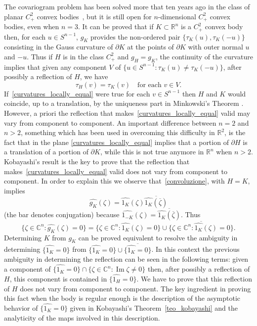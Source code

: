 \documentclass[a4paper]{amsart}
\theoremstyle{definition}
\numberwithin{equation}{section}
\begin{document}
The covariogram problem has been solved more that ten years ago in the class of planar $C^2_+$ convex bodies~\cite{Bianchi-Segala-Volcic-2002}, but it is still open for $n$-dimensional $C^2_+$ convex bodies, even when $n=3$.
It can be proved that if $K\subset{\mathbb{R}}^n$ is a $C^2_+$ convex body then, for each $u\in {S^{n-1}}$, $g_K$ provides the non-ordered pair $\{{\tau}_K(u),{\tau}_K(-u)\}$ consisting in the Gauss curvature of ${{\partial}} K$ at the points of $\partial K$ with outer normal $u$ and $-u$. Thus if $H$ is in the class $C^2_+$ and $g_H=g_K$, the continuity of the curvature implies that given any component $V$ of $\{u\in {S^{n-1}} : {\tau}_K(u)\neq {\tau}_K(-u)\}$, after possibly a reflection of $H$, we have
\begin{equation}\label{curvatures_locally_equal}
{\tau}_H(v)={\tau}_K(v)\quad\text{for each $v\in V$.}
\end{equation}
If~\eqref{curvatures_locally_equal} were true for each $v\in{S^{n-1}}$ then $H$ and $K$ would coincide, up to a translation, by the uniqueness part in Minkowski's Theorem \cite[Th. 7.2.1]{Sc}.
However, a priori the reflection that makes~\eqref{curvatures_locally_equal} valid may vary from component to component. 
An important difference between $n=2$ and $n>2$, something which has been used in overcoming this difficulty in ${\mathbb{R}}^2$, is the fact that in the plane \eqref{curvatures_locally_equal} implies that a portion of ${{\partial}} H$ is a translation of a portion of ${{\partial}} K$, while this is not true anymore in ${\mathbb{R}}^n$ when $n>2$.
Kobayashi's result is the key to prove that the reflection that makes~\eqref{curvatures_locally_equal} valid does not vary from component to component. In order to explain this we observe that~\eqref{convoluzione}, with $H=K$, implies
\[
{\widehat{{{g_K}}}}({{\zeta}})={\widehat{{{1_K}}}}({{\zeta}}){\overline{{{\widehat{{{1_K}}}}\left({\overline{{{\zeta}}}}\right)}}}
\]
(the bar denotes conjugation) because ${\widehat{{{1_{-K}}}}}(\zeta)={\overline{{{\widehat{{{1_{K}}}}}\left({\overline{\zeta}}\right)}}}$. Thus
\[
 \{{{\zeta}}\in{\mathbb{C}}^n : {\widehat{{{g_K}}}}({{\zeta}})=0\}=\{{{\zeta}}\in{\mathbb{C}}^n : {\widehat{{{1_K}}}}({{\zeta}})=0\}\cup{\overline{{\{{{\zeta}}\in{\mathbb{C}}^n : {\widehat{{{1_K}}}}({{\zeta}})=0\}}}}.
\]
Determining $K$ from $g_K$ can be proved equivalent to resolve the ambiguity in determining  $\{{\widehat{{{1_K}}}}=0\}$ from $\{{\widehat{{{1_K}}}}=0\}\cup{\overline{{\{{\widehat{{{1_K}}}}=0\}}}}$. 
In this context the previous ambiguity in determining the reflection can be seen in the following terms: given a  component of $\{{\widehat{{{1_K}}}}=0\}\cap\{{{\zeta}}\in{\mathbb{C}}^n : {\operatorname{Im}} {{\zeta}}\neq0\}$ then, after possibly a reflection of $H$, this component is contained in $\{{\widehat{{{1_H}}}}=0\}$. We have to prove that this reflection of $H$ does not vary from component to component.
The key ingredient in proving this fact when the body is regular enough is the description of the asymptotic behavior of $\{{\widehat{{{1_K}}}}=0\}$ given in  Kobayashi's Theorem~\ref{teo_kobayashi} and  the analyticity  of the maps involved in this description.
\end{document}
